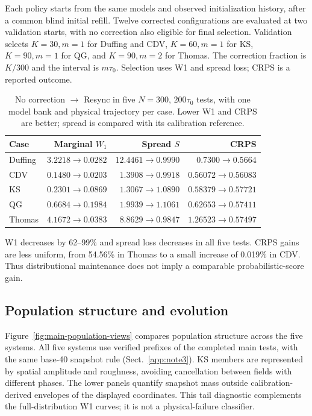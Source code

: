 \documentclass[gmd,manuscript]{copernicus}
\begin{document}
Each policy starts from the same models and observed initialization history, after a common blind initial refill. Twelve corrected configurations are evaluated at two validation starts, with no correction also eligible for final selection. Validation selects $K=30,m=1$ for Duffing and CDV, $K=60,m=1$ for KS, $K=90,m=1$ for QG, and $K=90,m=2$ for Thomas. The correction fraction is $K/300$ and the interval is $m\tau_0$. Selection uses W1 and spread loss; CRPS is a reported outcome.
\begin{table}[htbp]
\caption{No correction $\to$ Resync in five $N=300$, $200\tau_0$ tests, with one model bank and physical trajectory per case. Lower W1 and CRPS are better; spread is compared with its calibration reference.}
\label{tab:main-case-results}
\centering\small\begin{tabular}{lrrr}\toprule
Case & Marginal $W_1$ & Spread $S$ & CRPS\\\midrule
Duffing & $3.2218\to0.0282$ & $12.4461\to0.9990$ & $0.7300\to0.5664$\\
CDV & $0.1480\to0.0203$ & $1.3908\to0.9918$ & $0.56072\to0.56083$\\
KS & $0.2301\to0.0869$ & $1.3067\to1.0890$ & $0.58379\to0.57721$\\
QG & $0.6684\to0.1984$ & $1.9939\to1.1061$ & $0.62653\to0.57411$\\
Thomas & $4.1672\to0.0383$ & $8.8629\to0.9847$ & $1.26523\to0.57497$\\
\bottomrule\end{tabular}\end{table}

W1 decreases by 62--99\% and spread loss decreases in all five tests. CRPS gains are less uniform, from 54.56\% in Thomas to a small increase of 0.019\% in CDV. Thus distributional maintenance does not imply a comparable probabilistic-score gain.



\subsection{Population structure and evolution}
Figure~\ref{fig:main-population-views} compares population structure across the five systems. All five systems use verified prefixes of the completed main tests, with the same base-40 snapshot rule (Sect.~\ref{app:note3}). KS members are represented by spatial amplitude and roughness, avoiding cancellation between fields with different phases. The lower panels quantify snapshot mass outside calibration-derived envelopes of the displayed coordinates. This tail diagnostic complements the full-distribution W1 curves; it is not a physical-failure classifier.
\end{document}
